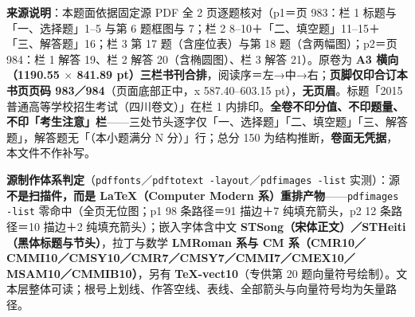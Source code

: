 


\begin{gktip}
\textbf{来源说明}：本题面依据固定源 PDF 全 2 页逐题核对（p1＝页 983：栏 1 标题与「一、选择题」1–5 与第 6 题框图与 7；栏 2 8–10＋「二、填空题」11–15＋「三、解答题」16；栏 3 第 17 题（含座位表）与第 18 题（含两幅图）；p2＝页 984：栏 1 解答 19、栏 2 解答 20（含椭圆图）、栏 3 解答 21）。原卷为 \textbf{A3 横向（1190.55 \(\times\) 841.89 pt）三栏书刊合排}，阅读序＝左→中→右；\textbf{页脚仅印合订本书页页码 983／984}（页面底部正中，x 587.40–603.15 pt），\textbf{无页眉}。标题「2015 普通高等学校招生考试（四川卷文）」在栏 1 内排印。\textbf{全卷不印分值、不印题量、不印「考生注意」栏}——三处节头逐字仅「一、选择题」「二、填空题」「三、解答题」，解答题无「（本小题满分 N 分）」行；总分 150 为结构推断，\textbf{卷面无凭据}，本文件不作补写。

\textbf{源制作体系判定}（\texttt{pdffonts}／\texttt{pdftotext -layout}／\texttt{pdfimages -list} 实测）：源\textbf{不是扫描件，而是 LaTeX（Computer Modern 系）重排产物}——\texttt{pdfimages -list} 零命中（全页无位图；p1 98 条路径＝91 描边＋7 纯填充箭头，p2 12 条路径＝10 描边＋2 纯填充箭头）；嵌入字体含中文 \textbf{STSong（宋体正文）／STHeiti（黑体标题与节头）}，拉丁与数学 \textbf{LMRoman 系与 CM 系（CMR10／CMMI10／CMSY10／CMR7／CMSY7／CMMI7／CMEX10／MSAM10／CMMIB10）}，另有 \textbf{TeX-vect10}（专供第 20 题向量符号绘制）。文本层整体可读；根号上划线、作答空线、表线、全部箭头与向量符号均为矢量路径。


\end{gktip}
